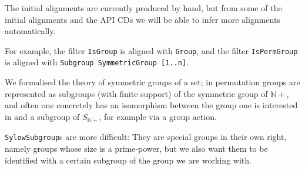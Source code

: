 The initial alignments are currently produced by hand, but from some of the
initial alignments and the \GAP API CDs we will be able to infer more alignments
automatically.

For example, the filter \texttt{IsGroup} is aligned with \texttt{Group}, and the
filter \texttt{IsPermGroup} is aligned with \texttt{Subgroup SymmetricGroup
  [1..n]}.

We formalised the theory of symmetric groups of a set; in \GAP permutation groups
are represented as subgroups (with finite support) of the symmetric group of
$\mathbb{N}+$, and often one concretely has an isomorphism between the group one
is interested in and a subgroup of $S_{\mathbb{N}+}$, for example
via a group action.

\texttt{SylowSubgroup}s are more difficult: They are special groups in their
own right, namely groups whose size is a prime-power, but we also want them
to be identified with a certain subgroup of the group we are working
with.


